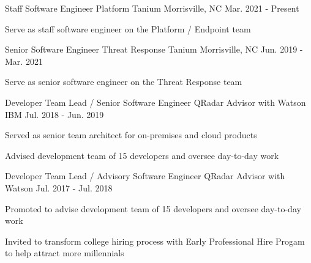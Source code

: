 
\begin{cventries}

  \cventry
    {Staff Software Engineer \enskip\textendash\enskip Platform} %
    {Tanium} %
    {Morrisville, NC} %
    {Mar. 2021 - Present} %
    {
      \begin{cvitems}
        \item {Serve as staff software engineer on the Platform / Endpoint team}
      \end{cvitems}
    }

  \cventry
    {Senior Software Engineer \enskip\textendash\enskip Threat Response} %
    {Tanium} %
    {Morrisville, NC} %
    {Jun. 2019 - Mar. 2021} %
    {
      \begin{cvitems}
        \item {Serve as senior software engineer on the Threat Response team}
      \end{cvitems}
    }

  \cventry
    {Developer Team Lead / Senior Software Engineer \enskip\textendash\enskip QRadar Advisor with Watson} %
    {IBM} %
    {} %
    {Jul. 2018 - Jun. 2019} %
    {
      \begin{cvitems}
        \item {Served as senior team architect for on-premises and cloud products}
        \item {Advised development team of 15 developers and oversee day-to-day work}
      \end{cvitems}
    }
    
  \cventry
    {Developer Team Lead / Advisory Software Engineer \enskip\textendash\enskip QRadar Advisor with Watson} %
    {} %
    {} %
    {Jul. 2017 - Jul. 2018} %
    {
      \begin{cvitems}
        \item {Promoted to advise development team of 15 developers and oversee day-to-day work}
        \item {Invited to transform college hiring process with Early Professional Hire Progam to help attract more millennials}
      \end{cvitems}
    }


\end{cventries}
